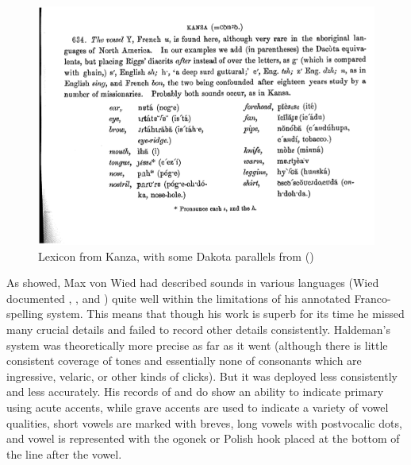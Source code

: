 \documentclass[output=paper]{LSP/langsci}
\begin{document}
\begin{figure}
\centering
 
\caption{Lexicon from {Kanza}, with some {Dakota} parallels from \citet{Riggs1852}  (\citealt[135, \S634]{Haldeman1860})} \label{haldemanlexicon}
\includegraphics[width=5in]{figures/GrantKanzaWords}
\end{figure}

As \citet{Rankin1994} showed, Max von Wied \citep{Maximilian18391841} had described sounds in various  languages (Wied documented , ,  and ) quite well within the limitations of his annotated Franco- spelling system. This means that though his work is superb for its time he missed many crucial details and failed to record other details consistently.   Haldeman's system was theoretically more precise as far as it went (although there is little consistent coverage of tones and essentially none of consonants which are ingressive, velaric, or other kinds of clicks). But it was deployed less consistently and less accurately.   His records of  and  do show an ability to indicate primary  using acute accents, while grave accents are used to indicate a variety of vowel qualities, short vowels are marked with breves, long vowels with postvocalic dots, and vowel  is represented with the ogonek or Polish hook placed at the bottom of the line after the vowel.  
 
\end{document}
